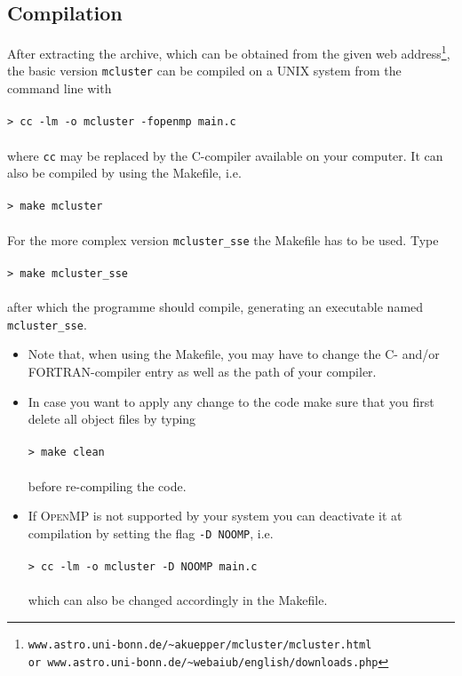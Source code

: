 \documentclass[useAMS,usenatbib]{mn2e}
\begin{document}
\subsection*{Compilation}
After extracting the archive, which can be obtained from the given web address\footnote{\texttt{www.astro.uni-bonn.de/\~{}akuepper/mcluster/mcluster.html\\or  www.astro.uni-bonn.de/\~{}webaiub/english/downloads.php}}, the basic version \texttt{mcluster} can be compiled on a \textsc{UNIX} system from the command line with\\\\
\texttt{> cc -lm -o mcluster -fopenmp main.c\\\\}
where \texttt{cc} may be replaced by the \textsc{C-}compiler available on your computer. It can also be compiled by using the Makefile, i.e.\\\\
\texttt{> make mcluster\\\\}
For the more complex version \texttt{mcluster\_sse} the Makefile has to be used. Type\\\\
\texttt{> make mcluster\_sse\\\\}
after which the programme should compile, generating an executable named \texttt{mcluster\_sse}. 
\begin{itemize}
\item Note that, when using the Makefile, you may have to change the \textsc{C-} and/or \textsc{FORTRAN-}compiler entry as well as the path of your compiler. 
\item In case you want to apply any change to the code make sure that you first delete all object files by typing\\\\
\texttt{> make clean\\\\}
before re-compiling the code.
\item If \textsc{OpenMP} is not supported by your system you can deactivate it at compilation by setting the flag \texttt{-D NOOMP}, i.e.\\\\
\texttt{> cc -lm -o mcluster -D NOOMP main.c\\\\}
which can also be changed accordingly in the Makefile.
\end{itemize}
\end{document}
